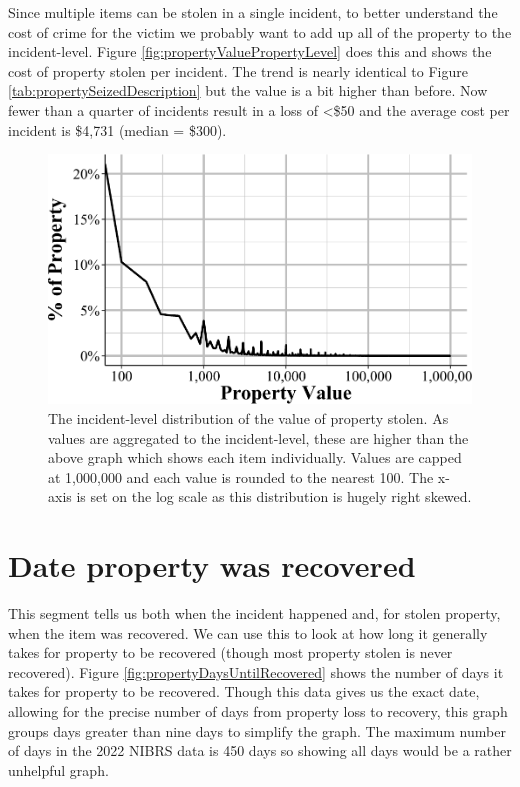 \documentclass[
  12pt,
  openany]{book}
\begin{document}
Since multiple items can be stolen in a single incident, to better understand the cost of crime for the victim we probably want to add up all of the property to the incident-level. Figure \ref{fig:propertyValuePropertyLevel} does this and shows the cost of property stolen per incident. The trend is nearly identical to Figure \ref{tab:propertySeizedDescription} but the value is a bit higher than before. Now fewer than a quarter of incidents result in a loss of \textless\$50 and the average cost per incident is \$4,731 (median = \$300).

\begin{figure}

{\centering \includegraphics[width=0.9\linewidth]{17_nibrs_property_files/figure-latex/propertyValueIncidentLevel-1} 

}

\caption{The incident-level distribution of the value of property stolen. As values are aggregated to the incident-level, these are higher than the above graph which shows each item individually. Values are capped at 1,000,000 and each value is rounded to the nearest 100. The x-axis is set on the log scale as this distribution is hugely right skewed.}\label{fig:propertyValueIncidentLevel}
\end{figure}

\section{Date property was recovered}\label{date-property-was-recovered}

This segment tells us both when the incident happened and, for stolen property, when the item was recovered. We can use this to look at how long it generally takes for property to be recovered (though most property stolen is never recovered). Figure \ref{fig:propertyDaysUntilRecovered} shows the number of days it takes for property to be recovered. Though this data gives us the exact date, allowing for the precise number of days from property loss to recovery, this graph groups days greater than nine days to simplify the graph. The maximum number of days in the 2022 NIBRS data is 450 days so showing all days would be a rather unhelpful graph.
\end{document}
